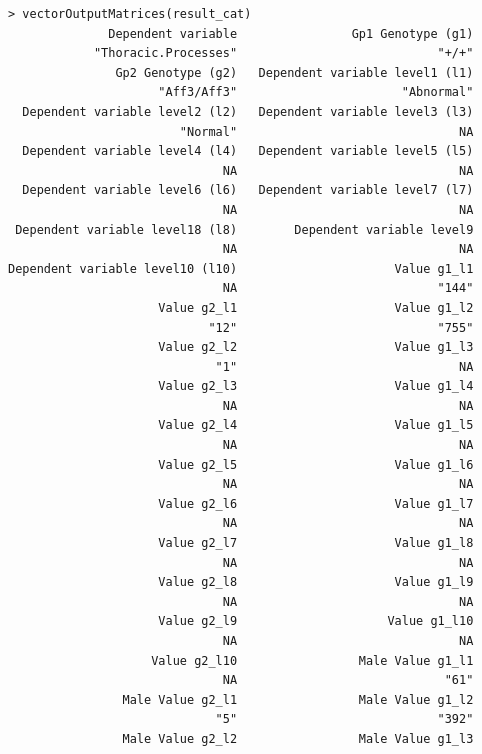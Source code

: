 \documentclass[12pt,a4paper]{article}
\begin{document}
\begingroup
    \fontsize{8pt}{12pt}\selectfont
\begin{verbatim}
> vectorOutputMatrices(result_cat)
              Dependent variable                Gp1 Genotype (g1) 
            "Thoracic.Processes"                            "+/+" 
               Gp2 Genotype (g2)   Dependent variable level1 (l1) 
                     "Aff3/Aff3"                       "Abnormal" 
  Dependent variable level2 (l2)   Dependent variable level3 (l3) 
                        "Normal"                               NA 
  Dependent variable level4 (l4)   Dependent variable level5 (l5) 
                              NA                               NA 
  Dependent variable level6 (l6)   Dependent variable level7 (l7) 
                              NA                               NA 
 Dependent variable level18 (l8)        Dependent variable level9 
                              NA                               NA 
Dependent variable level10 (l10)                      Value g1_l1 
                              NA                            "144" 
                     Value g2_l1                      Value g1_l2 
                            "12"                            "755" 
                     Value g2_l2                      Value g1_l3 
                             "1"                               NA 
                     Value g2_l3                      Value g1_l4 
                              NA                               NA 
                     Value g2_l4                      Value g1_l5 
                              NA                               NA 
                     Value g2_l5                      Value g1_l6 
                              NA                               NA 
                     Value g2_l6                      Value g1_l7 
                              NA                               NA 
                     Value g2_l7                      Value g1_l8 
                              NA                               NA 
                     Value g2_l8                      Value g1_l9 
                              NA                               NA 
                     Value g2_l9                     Value g1_l10 
                              NA                               NA 
                    Value g2_l10                 Male Value g1_l1 
                              NA                             "61" 
                Male Value g2_l1                 Male Value g1_l2 
                             "5"                            "392" 
                Male Value g2_l2                 Male Value g1_l3 

\end{verbatim}
\end{document}
